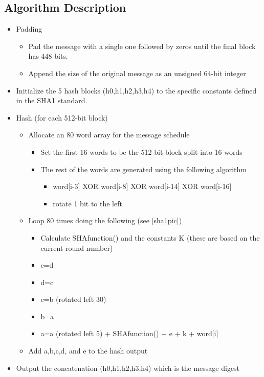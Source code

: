 \subsection{Algorithm Description}
\begin{itemize}
\item Padding
\begin{itemize}
\item Pad the message with a single one followed by zeros until the
final block has 448 bits.
\item Append the size of the original message as an unsigned 64-bit
integer
\end{itemize}
\item Initialize the 5 hash blocks (h0,h1,h2,h3,h4) to the specific
constants defined in the SHA1 standard.
\item Hash (for each 512-bit block)
\begin{itemize}
\item Allocate an 80 word array for the message schedule
 \begin{itemize}
 \item Set the first 16 words to be the 512-bit block split into 16 words
 \item The rest of the words are generated using the following algorithm
  \begin{itemize}
  \item word[i-3] XOR word[i-8] XOR word[i-14] XOR word[i-16] 
  \item rotate 1 bit to the left
  \end{itemize}
 \end{itemize}
\item Loop 80 times doing the following (see \ref{sha1pic})
\begin{itemize}
\item Calculate SHAfunction() and the constants K (these are based on
the current round number)
\item e=d
\item d=c
\item c=b (rotated left 30)
\item b=a
\item a=a (rotated left 5) + SHAfunction() + e + k + word[i]
\end{itemize}
\item Add a,b,c,d, and e to the hash output
\end{itemize}
\item Output the concatenation (h0,h1,h2,h3,h4) which is the message digest
\end{itemize}

